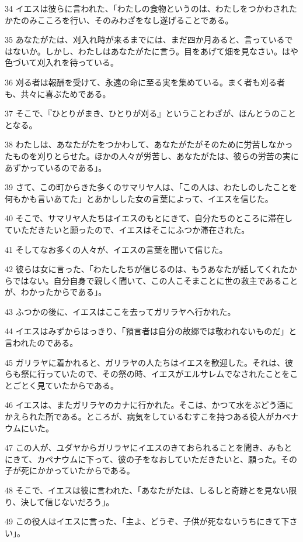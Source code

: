 \par 34 イエスは彼らに言われた、「わたしの食物というのは、わたしをつかわされたかたのみこころを行い、そのみわざをなし遂げることである。
\par 35 あなたがたは、刈入れ時が来るまでには、まだ四か月あると、言っているではないか。しかし、わたしはあなたがたに言う。目をあげて畑を見なさい。はや色づいて刈入れを待っている。
\par 36 刈る者は報酬を受けて、永遠の命に至る実を集めている。まく者も刈る者も、共々に喜ぶためである。
\par 37 そこで、『ひとりがまき、ひとりが刈る』ということわざが、ほんとうのこととなる。
\par 38 わたしは、あなたがたをつかわして、あなたがたがそのために労苦しなかったものを刈りとらせた。ほかの人々が労苦し、あなたがたは、彼らの労苦の実にあずかっているのである」。
\par 39 さて、この町からきた多くのサマリヤ人は、「この人は、わたしのしたことを何もかも言いあてた」とあかしした女の言葉によって、イエスを信じた。
\par 40 そこで、サマリヤ人たちはイエスのもとにきて、自分たちのところに滞在していただきたいと願ったので、イエスはそこにふつか滞在された。
\par 41 そしてなお多くの人々が、イエスの言葉を聞いて信じた。
\par 42 彼らは女に言った、「わたしたちが信じるのは、もうあなたが話してくれたからではない。自分自身で親しく聞いて、この人こそまことに世の救主であることが、わかったからである」。
\par 43 ふつかの後に、イエスはここを去ってガリラヤへ行かれた。
\par 44 イエスはみずからはっきり、「預言者は自分の故郷では敬われないものだ」と言われたのである。
\par 45 ガリラヤに着かれると、ガリラヤの人たちはイエスを歓迎した。それは、彼らも祭に行っていたので、その祭の時、イエスがエルサレムでなされたことをことごとく見ていたからである。
\par 46 イエスは、またガリラヤのカナに行かれた。そこは、かつて水をぶどう酒にかえられた所である。ところが、病気をしているむすこを持つある役人がカペナウムにいた。
\par 47 この人が、ユダヤからガリラヤにイエスのきておられることを聞き、みもとにきて、カペナウムに下って、彼の子をなおしていただきたいと、願った。その子が死にかかっていたからである。
\par 48 そこで、イエスは彼に言われた、「あなたがたは、しるしと奇跡とを見ない限り、決して信じないだろう」。
\par 49 この役人はイエスに言った、「主よ、どうぞ、子供が死なないうちにきて下さい」。
